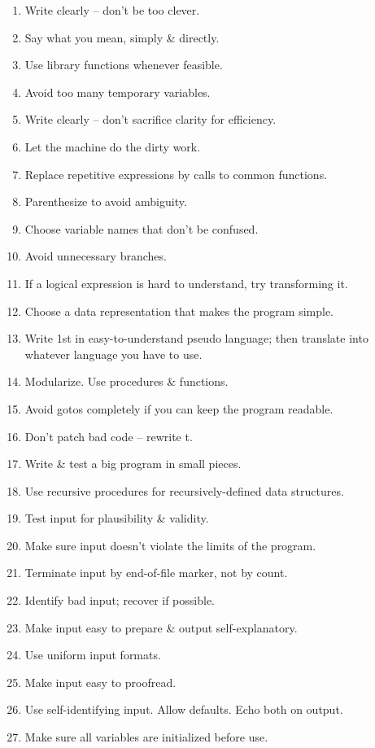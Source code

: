\documentclass{article}
\begin{document}
\begin{enumerate}
	\item Write clearly -- don't be too clever.
	\item Say what you mean, simply \& directly.
	\item Use library functions whenever feasible.
	\item Avoid too many temporary variables.
	\item Write clearly -- don't sacrifice clarity for efficiency.
	\item Let the machine do the dirty work.
	\item Replace repetitive expressions by calls to common functions.
	\item Parenthesize to avoid ambiguity.
	\item Choose variable names that don't be confused.
	\item Avoid unnecessary branches.
	\item If a logical expression is hard to understand, try transforming it.
	\item Choose a data representation that makes the program simple.
	\item Write 1st in easy-to-understand pseudo language; then translate into whatever language you have to use.
	\item Modularize. Use procedures \& functions.
	\item Avoid gotos completely if you can keep the program readable.
	\item Don't patch bad code -- rewrite t.
	\item Write \& test a big program in small pieces.
	\item Use recursive procedures for recursively-defined data structures.
	\item Test input for plausibility \& validity.
	\item Make sure input doesn't violate the limits of the program.
	\item Terminate input by end-of-file marker, not by count.
	\item Identify bad input; recover if possible.
	\item Make input easy to prepare \& output self-explanatory.
	\item Use uniform input formats.
	\item Make input easy to proofread.
	\item Use self-identifying input. Allow defaults. Echo both on output.
	\item Make sure all variables are initialized before use.

\end{enumerate}
\end{document}
